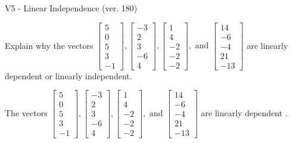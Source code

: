 \begin{exercise}
  \begin{exerciseTitle}V5 - Linear Independence (ver. 180)\end{exerciseTitle}
  \begin{exerciseStatement}
    Explain why the vectors \(\left[\begin{array}{r}
5 \\
0 \\
5 \\
3 \\
-1
\end{array}\right] , \left[\begin{array}{r}
-3 \\
2 \\
3 \\
-6 \\
4
\end{array}\right] , \left[\begin{array}{r}
1 \\
4 \\
-2 \\
-2 \\
-2
\end{array}\right] , \text{ and } \left[\begin{array}{r}
14 \\
-6 \\
-4 \\
21 \\
-13
\end{array}\right]\) are linearly dependent or linearly independent.	


  \end{exerciseStatement}
  \begin{exerciseAnswer}
   The vectors \(\left[\begin{array}{r}
5 \\
0 \\
5 \\
3 \\
-1
\end{array}\right] , \left[\begin{array}{r}
-3 \\
2 \\
3 \\
-6 \\
4
\end{array}\right] , \left[\begin{array}{r}
1 \\
4 \\
-2 \\
-2 \\
-2
\end{array}\right] , \text{ and } \left[\begin{array}{r}
14 \\
-6 \\
-4 \\
21 \\
-13
\end{array}\right]\) are 
  	 linearly dependent  .
  


  \end{exerciseAnswer}
\end{exercise}